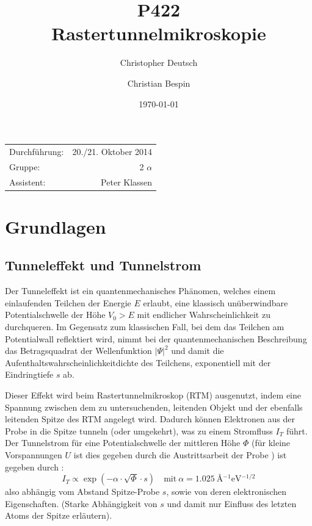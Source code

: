 \documentclass[10pt, a4paper]{article}
\title{P422 \\ Rastertunnelmikroskopie}
\author{Christopher Deutsch \and Christian Bespin}
\date{\today}
\begin{document}
  
\maketitle

\begin{center}
\begin{tabular}{l r}
Durchführung: & 20./21. Oktober 2014 \\
Gruppe: & 2 $\alpha$ \\
Assistent: & Peter Klassen
\end{tabular}
\end{center}

\begin{abstract}
\end{abstract}

\tableofcontents
\newpage

\section{Grundlagen}

\subsection{Tunneleffekt und Tunnelstrom}
Der Tunneleffekt ist ein quantenmechanisches Phänomen, welches einem einlaufenden Teilchen der Energie $E$ erlaubt, eine klassisch unüberwindbare Potentialschwelle der Höhe $V_0 > E$ mit endlicher Wahrscheinlichkeit zu durchqueren.
Im Gegensatz zum klassischen Fall, bei dem das Teilchen am Potentialwall reflektiert wird, nimmt bei der quantenmechanischen Beschreibung das Betragsquadrat der Wellenfunktion $|\Psi|^2$ und damit die Aufenthaltswahrscheinlichkeitdichte des Teilchens, exponentiell mit der Eindringtiefe $s$ ab.

Dieser Effekt wird beim Rastertunnelmikroskop (RTM) ausgenutzt, indem eine Spannung zwischen dem zu untersuchenden, leitenden Objekt und der ebenfalls leitenden Spitze des RTM angelegt wird. Dadurch können Elektronen aus der Probe in die Spitze tunneln (oder umgekehrt), was zu einem Stromfluss $I_T$ führt.
Der Tunnelstrom für eine Potentialschwelle der mittleren Höhe $\Phi$ (für kleine Vorspannungen $U$ ist dies gegeben durch die Austrittsarbeit der Probe \cite{colton}) ist gegeben durch \cite{binning}:
\begin{equation}
  I_T \propto \exp(-\alpha \cdot \sqrt{\Phi} \cdot s) \quad \text{mit}\: \alpha = \SI{1,025}{\angstrom^{-1}\electronvolt^{-1/2}}
\end{equation}
also abhängig vom Abstand Spitze-Probe $s$, sowie von deren elektronischen Eigenschaften.
(Starke Abhängigkeit von $s$ und damit nur Einfluss des letzten Atoms der Spitze erläutern).
\end{document}
